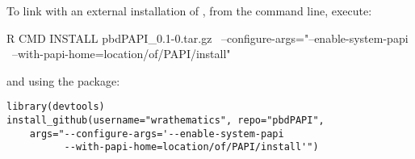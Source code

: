 To link with an external installation of \PAPI, from the command line, execute:
\begin{Command}
R CMD INSTALL pbdPAPI_0.1-0.tar.gz \ 
    --configure-args="--enable-system-papi \ 
    --with-papi-home=location/of/PAPI/install"
\end{Command}
and using the  package:
\begin{lstlisting}
library(devtools)
install_github(username="wrathematics", repo="pbdPAPI", 
    args="--configure-args='--enable-system-papi 
          --with-papi-home=location/of/PAPI/install'")
\end{lstlisting}
